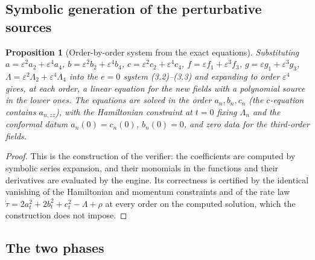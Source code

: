 \documentclass[11pt]{article}
\newtheorem{proposition}[theorem]{Proposition}
\theoremstyle{remark}
\begin{document}
\subsection{Symbolic generation of the perturbative sources}

\begin{proposition}[Order-by-order system from the exact equations]
\label{prop:v20v3-generation}
Substituting \(a=\varepsilon^2a_2+\varepsilon^4a_4\),
\(b=\varepsilon^2b_2+\varepsilon^4b_4\), \(c=\varepsilon^2c_2+\varepsilon^4c_4\),
\(f=\varepsilon f_1+\varepsilon^3f_3\), \(g=\varepsilon g_1+\varepsilon^3g_3\),
\(\Lambda=\varepsilon^2\Lambda_2+\varepsilon^4\Lambda_4\) into the
\(e=0\) system (3.2)--(3.3) and expanding to order \(\varepsilon^4\)
gives, at each order, a linear equation for the new fields with a
polynomial source in the lower ones.  The equations are solved in the
order \(a_n,b_n,c_n\) (the \(c\)-equation contains \(a_{n,zz}\)),
with the Hamiltonian constraint at \(t=0\) fixing \(\Lambda_n\) and the
conformal datum \(a_n(0)=c_n(0)\), \(b_n(0)=0\), and zero data for the
third-order fields.
\end{proposition}

\begin{proof}
This is the construction of the verifier: the coefficients are
computed by symbolic series expansion, and their monomials in the
functions and their derivatives are evaluated by the engine.  Its
correctness is certified by the identical vanishing of the
Hamiltonian and momentum constraints and of the rate law
\(\dot\tau=2a_t^2+2b_t^2+c_t^2-\Lambda+\rho\) at every order on the
computed solution, which the construction does not impose.
\end{proof}

\subsection{The two phases}
\end{document}
